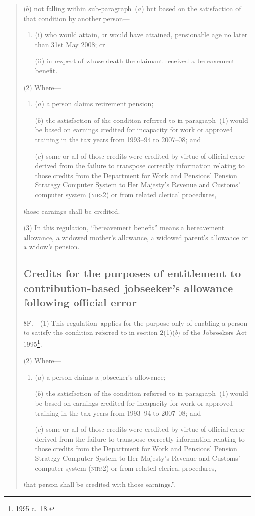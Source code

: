 \documentclass[12pt,a4paper]{article}
\begin{document}
\begin{quotation}
\begin{enumerate}
($b$) not falling within sub-paragraph~($a$)  but based on the satisfaction of that condition by another person—
\begin{enumerate}\item[]
(i) who would attain, or would have attained, pensionable age no later than 31st May 2008; or

(ii) in respect of whose death the claimant received a bereavement benefit.
\end{enumerate}
\end{enumerate}

(2) Where—
\begin{enumerate}\item[]
($a$) a person claims retirement pension;

($b$) the satisfaction of the condition referred to in paragraph~(1) would be based on earnings credited for incapacity for work or approved training in the tax years from 1993--94 to 2007--08; and

($c$) some or all of those credits were credited by virtue of official error derived from the failure to transpose correctly information relating to those credits from the Department for Work and Pensions’ Pension Strategy Computer System to Her Majesty’s Revenue and Customs’ computer system (\textsc{\lowercase{NIRS2}}) or from related clerical procedures,
\end{enumerate}
those earnings shall be credited.

(3) In this regulation, “bereavement benefit” means a bereavement allowance, a widowed mother’s allowance, a widowed parent’s allowance or a widow’s pension.

\subsection*{Credits for the purposes of entitlement to contribution\hspace{0pt}-based jobseeker’s allowance following official error}

8F.---(1)  This regulation~applies for the purpose only of enabling a person to satisfy the condition referred to in section 2(1)($b$)  of the Jobseekers Act 1995\footnote{1995 c.~18.}.

(2) Where—
\begin{enumerate}\item[]
($a$) a person claims a jobseeker’s allowance;

($b$) the satisfaction of the condition referred to in paragraph~(1) would be based on earnings credited for incapacity for work or approved training in the tax years from 1993--94 to 2007--08; and

($c$) some or all of those credits were credited by virtue of official error derived from the failure to transpose correctly information relating to those credits from the Department for Work and Pensions’ Pension Strategy Computer System to Her Majesty’s Revenue and Customs’ computer system (\textsc{\lowercase{NIRS2}}) or from related clerical procedures,
\end{enumerate}
that person shall be credited with those earnings.”.
\end{quotation}
\end{document}
